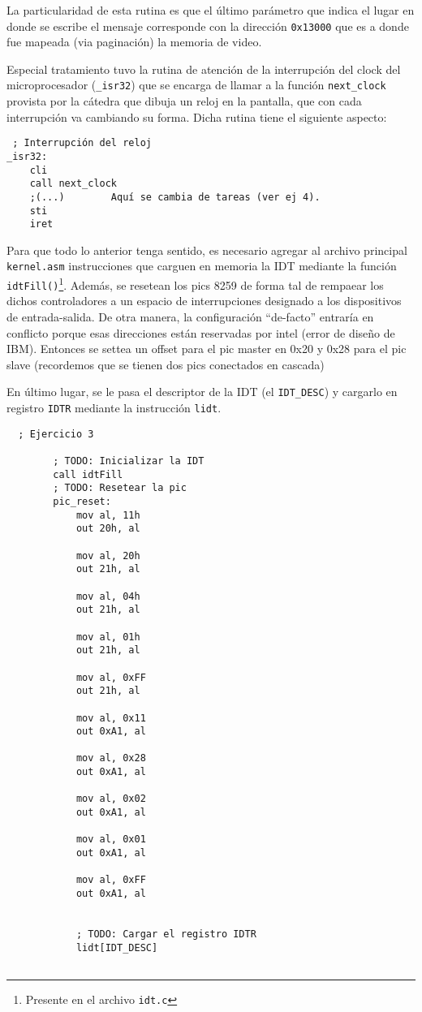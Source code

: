 La particularidad de esta rutina es que el último parámetro que indica el lugar en donde se escribe el mensaje corresponde con la dirección \texttt{0x13000} que es a donde fue mapeada (via paginación) la memoria de video. %

Especial tratamiento tuvo la rutina de atención de la interrupción del clock del microprocesador (\texttt{\_isr32}) que se encarga de llamar a la función \texttt{next\_clock} provista por la cátedra que dibuja un reloj en la pantalla, que con cada interrupción va cambiando su forma. Dicha rutina tiene el siguiente aspecto:
\begin{verbatim}
 ; Interrupción del reloj
_isr32:    
    cli
    call next_clock
    ;(...)        Aquí se cambia de tareas (ver ej 4).
    sti  
    iret
\end{verbatim}

Para que todo lo anterior tenga sentido, es necesario agregar al archivo principal \texttt{kernel.asm} instrucciones que carguen en memoria la IDT mediante la función \texttt{idtFill()}\footnote{Presente en el archivo \texttt{idt.c}}. Además, se resetean los pics 8259 de forma tal de rempaear los dichos controladores a un espacio de interrupciones designado a los dispositivos de entrada-salida. %
De otra manera, la configuración ``de-facto'' entraría en conflicto porque esas direcciones están reservadas por intel (error de diseño de IBM). Entonces se settea un offset para el pic master en 0x20 y 0x28 para el pic slave (recordemos que se tienen dos pics conectados en cascada) %

En último lugar, se le pasa el descriptor de la IDT (el \texttt{IDT\_DESC}) y cargarlo en registro \texttt{IDTR} mediante la instrucción \texttt{lidt}.

\begin{verbatim}
  ; Ejercicio 3
    
        ; TODO: Inicializar la IDT
        call idtFill
        ; TODO: Resetear la pic
        pic_reset:
            mov al, 11h
            out 20h, al

            mov al, 20h
            out 21h, al

            mov al, 04h
            out 21h, al

            mov al, 01h
            out 21h, al

            mov al, 0xFF
            out 21h, al

            mov al, 0x11
            out 0xA1, al

            mov al, 0x28
            out 0xA1, al

            mov al, 0x02
            out 0xA1, al

            mov al, 0x01
            out 0xA1, al

            mov al, 0xFF
            out 0xA1, al
       

            ; TODO: Cargar el registro IDTR
            lidt[IDT_DESC]
           
\end{verbatim}


